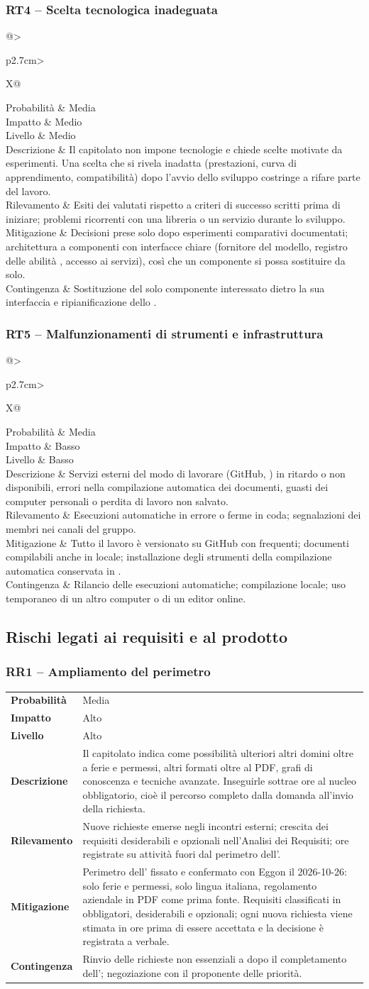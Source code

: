 \documentclass[documento]{gpt}
\makeatletter
\newcommand{\rischio}[9]{%
  \subsubsection{#1 -- #2}\label{rischio:#1}
  \noindent
  \begin{tabularx}{\linewidth}{@{}>{\raggedright\arraybackslash\bfseries}p{2.7cm}>{\raggedright\arraybackslash}X@{}}
    \toprule
    Probabilità & #3 \\
    Impatto     & #4 \\
    Livello     & #5 \\
    \midrule
    Descrizione & #6 \\
    \addlinespace
    Rilevamento & #7 \\
    \addlinespace
    Mitigazione & #8 \\
    \addlinespace
    Contingenza & #9 \\
    \bottomrule
  \end{tabularx}
  \medskip
}
\makeatother
\begin{document}
\rischio{RT4}{Scelta tecnologica inadeguata}{Media}{Medio}{Medio}
{Il capitolato non impone tecnologie e chiede scelte motivate da
 esperimenti. Una scelta che si rivela inadatta (prestazioni, curva di
 apprendimento, compatibilità) dopo l'avvio dello sviluppo costringe a
 rifare parte del lavoro.}
{Esiti dei \glo{PoC} valutati rispetto a criteri di successo scritti prima di
 iniziare; problemi ricorrenti con una libreria o un servizio durante lo
 sviluppo.}
{Decisioni prese solo dopo esperimenti comparativi documentati; architettura a componenti con interfacce chiare (fornitore del
 modello, registro delle abilità \glo{MCP}, accesso ai servizi), così che un
 componente si possa sostituire da solo.}
{Sostituzione del solo componente interessato dietro la sua interfaccia e
 ripianificazione dello \glo[Sprint]{\textit{sprint}}.}

\rischio{RT5}{Malfunzionamenti di strumenti e infrastruttura}{Media}{Basso}{Basso}
{Servizi esterni del modo di lavorare (GitHub, \glo{GitHub Actions}) in ritardo o
 non disponibili, errori nella compilazione automatica dei documenti,
 guasti dei computer personali o perdita di lavoro non salvato.}
{Esecuzioni automatiche in errore o ferme in coda; segnalazioni dei membri
 nei canali del gruppo.}
{Tutto il lavoro è versionato su GitHub con \glo[Push]{\textit{push}} frequenti;
 documenti compilabili anche in locale; installazione degli strumenti
 della compilazione automatica conservata in \glo{cache}.}
{Rilancio delle esecuzioni automatiche; compilazione locale; uso
 temporaneo di un altro computer o di un editor online.}

\subsection{Rischi legati ai requisiti e al prodotto}

\rischio{RR1}{Ampliamento del perimetro}{Media}{Alto}{Alto}
{Il capitolato indica come possibilità ulteriori altri domini oltre a
 ferie e permessi, altri formati oltre al PDF, grafi di conoscenza e
 tecniche avanzate. Inseguirle sottrae ore al nucleo obbligatorio, cioè
 il percorso completo dalla domanda all'invio della richiesta.}
{Nuove richieste emerse negli incontri esterni; crescita dei requisiti
 desiderabili e opzionali nell'Analisi dei Requisiti; ore registrate su
 attività fuori dal perimetro dell'\glo{MVP}.}
{Perimetro dell'\glo{MVP} fissato e confermato con Eggon il 2026-10-26: solo
 ferie e permessi, solo lingua italiana, regolamento aziendale in PDF come
 prima fonte. Requisiti classificati in obbligatori, desiderabili e
 opzionali; ogni nuova richiesta viene stimata in ore prima di essere
 accettata e la decisione è registrata a verbale.}
{Rinvio delle richieste non essenziali a dopo il completamento dell'\glo{MVP};
 negoziazione con il proponente delle priorità.}
\end{document}
